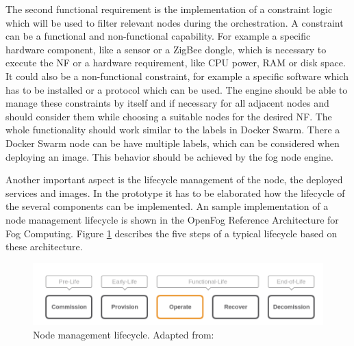 The second functional requirement is the implementation of a constraint logic which will be used to filter relevant nodes during the orchestration.
A constraint can be a functional and non-functional capability.
For example a specific hardware component, like a sensor or a ZigBee dongle, which is necessary to execute the \ac{NF} or a hardware requirement, like \ac{CPU} power, \ac{RAM} or disk space.
It could also be a non-functional constraint, for example a specific software which has to be installed or a protocol which can be used.
The engine should be able to manage these constraints by itself and if necessary for all adjacent nodes and should consider them while choosing a suitable nodes for the desired \ac{NF}.
The whole functionality should work similar to the labels in Docker Swarm.
There a Docker Swarm node can be have multiple labels, which can be considered when deploying an image.
This behavior should be achieved by the fog node engine.

Another important aspect is the lifecycle management of the node, the deployed services and images.
In the prototype it has to be elaborated how the lifecycle of the several components can be implemented.
An sample implementation of a node management lifecycle is shown in the OpenFog Reference Architecture for Fog Computing\autocite[p. 52 f.]{OpenFog:2017}.
Figure \ref{fig:open_fog_node_mgm_lifecycle} describes the five steps of a typical lifecycle based on these architecture.
\begin{figure}[H]
    \centering
    \includegraphics[width=\textwidth]{resources/images/node_management_lifecycle.png}
    \caption[Node management lifecycle]{Node management lifecycle. Adapted from: \autocite[p. 52]{OpenFog:2017}}
    \label{fig:open_fog_node_mgm_lifecycle}
\end{figure}


